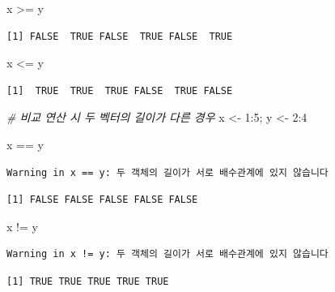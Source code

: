 \documentclass[
  11pt,
]{krantz}
\newenvironment{Shaded}{\begin{snugshade}}{\end{snugshade}}
\newcommand{\CommentTok}[1]{\textcolor[rgb]{0.37,0.37,0.37}{\textit{#1}}}
\newcommand{\DecValTok}[1]{\textcolor[rgb]{0.06,0.06,0.06}{#1}}
\newcommand{\NormalTok}[1]{#1}
\newcommand{\OtherTok}[1]{\textcolor[rgb]{0.37,0.37,0.37}{#1}}
\newcommand{\SpecialCharTok}[1]{\textcolor[rgb]{0,0,0}{#1}}
\begin{document}
\begin{Shaded}
\begin{Highlighting}[]
\NormalTok{x }\SpecialCharTok{\textgreater{}=}\NormalTok{ y}
\end{Highlighting}
\end{Shaded}

\begin{verbatim}
[1] FALSE  TRUE FALSE  TRUE FALSE  TRUE
\end{verbatim}

\begin{Shaded}
\begin{Highlighting}[]
\NormalTok{x }\SpecialCharTok{\textless{}=}\NormalTok{ y}
\end{Highlighting}
\end{Shaded}

\begin{verbatim}
[1]  TRUE  TRUE  TRUE FALSE  TRUE FALSE
\end{verbatim}

\begin{Shaded}
\begin{Highlighting}[]
\CommentTok{\# 비교 연산 시 두 벡터의 길이가 다른 경우}
\NormalTok{x }\OtherTok{\textless{}{-}} \DecValTok{1}\SpecialCharTok{:}\DecValTok{5}\NormalTok{; y }\OtherTok{\textless{}{-}} \DecValTok{2}\SpecialCharTok{:}\DecValTok{4}

\NormalTok{x }\SpecialCharTok{==}\NormalTok{ y}
\end{Highlighting}
\end{Shaded}

\begin{verbatim}
Warning in x == y: 두 객체의 길이가 서로 배수관계에 있지 않습니다
\end{verbatim}

\begin{verbatim}
[1] FALSE FALSE FALSE FALSE FALSE
\end{verbatim}

\begin{Shaded}
\begin{Highlighting}[]
\NormalTok{x }\SpecialCharTok{!=}\NormalTok{ y}
\end{Highlighting}
\end{Shaded}

\begin{verbatim}
Warning in x != y: 두 객체의 길이가 서로 배수관계에 있지 않습니다
\end{verbatim}

\begin{verbatim}
[1] TRUE TRUE TRUE TRUE TRUE
\end{verbatim}
\end{document}
